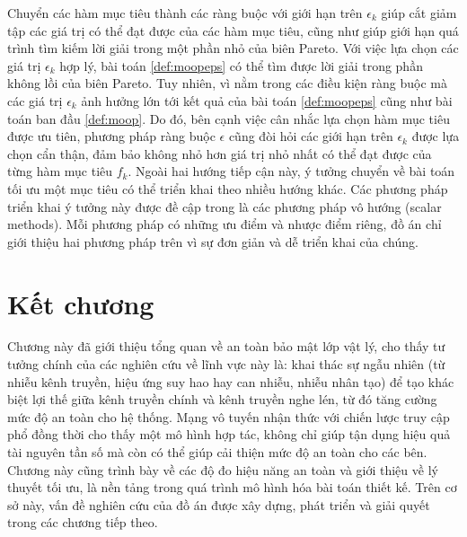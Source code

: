 \documentclass[../main.tex]{subfiles}
\begin{document}
Chuyển các hàm mục tiêu thành các ràng buộc với giới hạn trên $\epsilon_k$ giúp cắt giảm tập các giá trị có thể đạt được của các hàm mục tiêu, cũng như giúp giới hạn quá trình tìm kiếm lời giải trong một phần nhỏ của biên Pareto. Với việc lựa chọn các giá trị $\epsilon_k$ hợp lý, bài toán \eqref{def:moopeps} có thể tìm được lời giải trong phần không lồi của biên Pareto. Tuy nhiên, vì nằm trong các điều kiện ràng buộc mà các giá trị $\epsilon_k$ ảnh hưởng lớn tới kết quả của bài toán \eqref{def:moopeps} cũng như bài toán ban đầu \eqref{def:moop}. Do đó, bên cạnh việc cân nhắc lựa chọn hàm mục tiêu được ưu tiên, phương pháp ràng buộc $\epsilon$ cũng đòi hỏi các giới hạn trên $\epsilon_k$ được lựa chọn cẩn thận, đảm bảo không nhỏ hơn giá trị nhỏ nhất có thể đạt được của từng hàm mục tiêu $f_k$. Ngoài hai hướng tiếp cận này, ý tưởng chuyển về bài toán tối ưu một mục tiêu có thể triển khai theo nhiều hướng khác. Các phương pháp triển khai ý tưởng này được đề cập trong \cite{collette2004multiobjective} là các phương pháp vô hướng (scalar methods). Mỗi phương pháp có những ưu điểm và nhược điểm riêng, đồ án chỉ giới thiệu hai phương pháp trên vì sự đơn giản và dễ triển khai của chúng.

\section{Kết chương}

Chương này đã giới thiệu tổng quan về an toàn bảo mật lớp vật lý, cho thấy tư tưởng chính của các nghiên cứu về lĩnh vực này là: khai thác sự ngẫu nhiên (từ nhiễu kênh truyền, hiệu ứng suy hao hay can nhiễu, nhiễu nhân tạo) để tạo khác biệt lợi thế giữa kênh truyền chính và kênh truyền nghe lén, từ đó tăng cường mức độ an toàn cho hệ thống. Mạng vô tuyến nhận thức với chiến lược truy cập phổ đồng thời cho thấy một mô hình hợp tác, không chỉ giúp tận dụng hiệu quả tài nguyên tần số mà còn có thể giúp cải thiện mức độ an toàn cho các bên. Chương này cũng trình bày về các độ đo hiệu năng an toàn và giới thiệu về lý thuyết tối ưu, là nền tảng trong quá trình mô hình hóa bài toán thiết kế. Trên cơ sở này, vấn đề nghiên cứu của đồ án được xây dựng, phát triển và giải quyết trong các chương tiếp theo.
\end{document}
